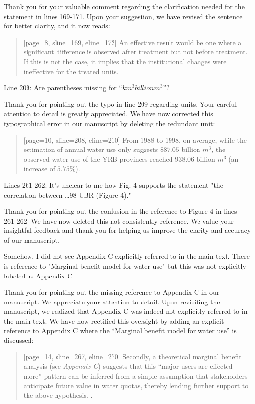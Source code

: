 \AR{} Thank you for your valuable comment regarding the clarification needed for the statement in lines 169-171. Upon your suggestion, we have revised the sentence for better clarity, and it now reads:

\begin{quote}[page=8, sline=169, eline=172]
    An effective result would be one where a significant difference is observed after treatment but not before treatment. If this is not the case, it implies that the institutional changes were ineffective for the treated units.
\end{quote}

\RC{} Line 209: Are parentheses missing for ``$km^3 billion m^3$''?

\AR{} Thank you for pointing out the typo in line 209 regarding units. Your careful attention to detail is greatly appreciated. We have now corrected this typographical error in our manuscript by deleting the redundant unit:

\begin{quote}[page=10, sline=208, eline=210]
    From 1988 to 1998, on average, while the estimation of annual water use only suggests $887.05$ billion $m^3$, the observed water use of the YRB provinces reached $938.06$ billion $m^3$ (an increase of $5.75\%$).
\end{quote}

\RC{} Lines 261-262: It's unclear to me how Fig. 4 supports the statement "the correlation between \dots 98-UBR (Figure 4)."

\AR{} Thank you for pointing out the confusion in the reference to Figure 4 in lines 261-262. We have now deleted this not consistently reference. We value your insightful feedback and thank you for helping us improve the clarity and accuracy of our manuscript.

\RC{} Somehow, I did not see Appendix C explicitly referred to in the main text. There is reference to "Marginal benefit model for water use" but this was not explicitly labeled as Appendix C.

\AR{} Thank you for pointing out the missing reference to Appendix C in our manuscript. We appreciate your attention to detail. Upon revisiting the manuscript, we realized that Appendix C was indeed not explicitly referred to in the main text. We have now rectified this oversight by adding an explicit reference to Appendix C where the ``Marginal benefit model for water use'' is discussed:

\begin{quote}[page=14, sline=267, eline=270]
    Secondly, a theoretical marginal benefit analysis (see \textit{Appendix C}) suggests that this ``major users are effected more'' pattern can be inferred from a simple assumption that stakeholders anticipate future value in water quotas, thereby lending further support to the above hypothesis.
.
\end{quote}


